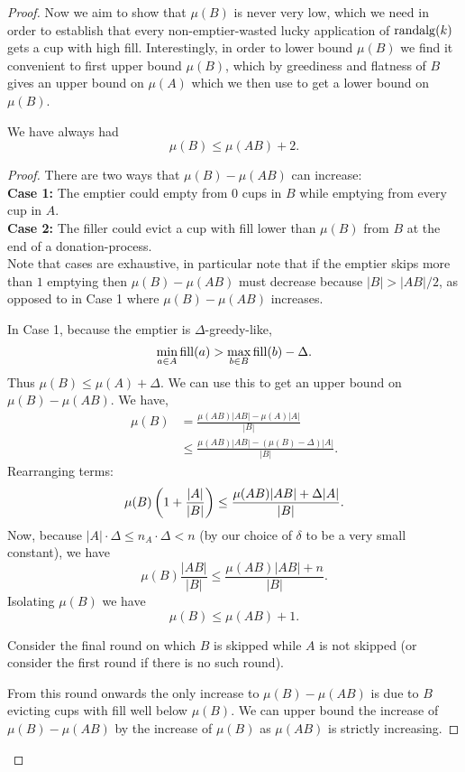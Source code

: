 \begin{proof}
Now we aim to show that $\mu(B)$ is never very low, which we need
in order to establish that every non-emptier-wasted lucky
application of $\operatorname{\text{\textup{randalg}}}(k)$ gets a cup with high fill.
Interestingly, in order to lower bound $\mu(B)$ we find it
convenient to first upper bound $\mu(B)$, which by greediness and
flatness of $B$ gives an upper bound on $\mu(A)$ which we then
use to get a lower bound on $\mu(B)$.

\begin{clm}
  \label{clm:muBdoesntgettoobig}
  We have always had
  $$\mu(B) \le \mu(AB) + 2.$$
\end{clm}
\begin{proof}
  There are two ways that $\mu(B)-\mu(A B)$ can increase: \\
  \textbf{Case 1:}
  The emptier could empty from $0$ cups in $B$ while emptying
  from every cup in $A$. \\
  \textbf{Case 2:}
  The filler could evict a cup with fill lower than $\mu(B)$ from
  $B$ at the end of a donation-process. \\

  Note that cases are exhaustive, in particular note that if the
  emptier skips more than $1$ emptying then $\mu(B) - \mu(AB)$
  must decrease because $|B| > |AB|/2$, as opposed to in Case 1
  where $\mu(B) - \mu(AB)$ increases.

  In Case 1, because the emptier is $\Delta$-greedy-like,
  $$\min_{a\in A} \operatorname{\text{\textup{fill}}}(a) > \max_{b\in B} \operatorname{\text{\textup{fill}}}(b) - \Delta.$$
  Thus $\mu(B) \le \mu(A) + \Delta$. We can use this to get an
  upper bound on $\mu(B) - \mu(AB)$. We have, 
  \begin{align*}
    \mu(B) &= \frac{\mu(AB) |AB| - \mu(A) |A|}{|B|}\\
           &\le \frac{\mu(AB) |AB| - (\mu(B) - \Delta) |A|}{|B|}.
  \end{align*}
  Rearranging terms:
  $$\mu(B) \left( 1+\frac{|A|}{|B|} \right) \le \frac{\mu(AB) |AB| + \Delta |A|}{|B|}.$$
  Now, because $|A| \cdot \Delta \le n_A
  \cdot \Delta < n$ (by our choice of $\delta$ to be a very small
  constant), we have 
  $$\mu(B) \frac{|AB|}{|B|}\le \frac{\mu(AB) |AB| + n}{|B|}.$$
  Isolating $\mu(B)$ we have 
  $$\mu(B) \le \mu(AB) + 1.$$

  Consider the final round on which $B$ is skipped while $A$ is
  not skipped (or consider the first round if there is no such
  round).

  From this round onwards the only increase to $\mu(B) - \mu(A
  B)$ is due to $B$ evicting cups with fill well below $\mu(B)$.
  We can upper bound the increase of $\mu(B) - \mu(AB)$ by the
  increase of $\mu(B)$ as $\mu(AB)$ is strictly increasing.


\end{proof}
\end{proof}
